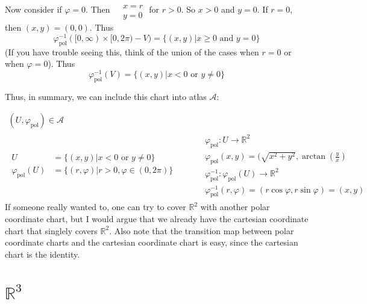 \documentclass[10pt, twoside]{amsart}
\begin{document}
\begin{multicols*}{2}
Now consider if $\varphi=0$.  Then $\begin{aligned} & \quad \\
  & x = r \\ 
  & y = 0 \end{aligned}$ for $r>0$.  So $x>0$ and $y=0$.  If $r=0$, then $(x,y)=(0,0)$.  Thus
\[
\varphi_{\text{pol}}^{-1}( [0,\infty) \times [0,2\pi)-V) = \lbrace (x,y) | x\geq 0 \text{ and } y=0 \rbrace
\]
(If you have trouble seeing this, think of the union of the cases when $r=0$ or when $\varphi=0$).  Thus
\[
\varphi^{-1}_{\text{pol}}(V) = \lbrace (x,y) | x<0 \text{ or } y \neq 0 \rbrace
\]

Thus, in summary, we can include this chart into atlas $\mathcal{A}$:

\begin{equation} \label{Eq:UR2}
\begin{gathered}
  (U, \varphi_{\text{pol}}) \in \mathcal{A} \\ 
  \begin{aligned}
    U & = \lbrace (x,y) | x<0 \text{ or } y \neq 0 \rbrace  \\
    \varphi_{\text{pol}}(U) & = \lbrace (r,\varphi) | r >0, \varphi \in (0,2\pi) \rbrace
\end{aligned} \quad \quad \, \begin{aligned}
    & \varphi_{\text{pol}}:U \to \mathbb{R}^2 \\ 
    & \varphi_{\text{pol}}(x,y) = ( \sqrt{x^2 + y^2}, \arctan{ \left( \frac{y}{x} \right) } \\ 
    & \varphi^{-1}_{\text{pol}}: \varphi_{\text{pol}}(U) \to \mathbb{R}^2 \\ 
    & \varphi^{-1}_{\text{pol}}(r,\varphi) = (r\cos{\varphi}, r\sin{\varphi}) = (x,y)
\end{aligned}
\end{gathered}
\end{equation}
If someone really wanted to, one can try to cover $\mathbb{R}^2$ with another polar coordinate chart, but I would argue that we already have the cartesian coordinate chart that singlely covers $\mathbb{R}^2$. Also note that the transition map between polar coordinate charts and the cartesian coordinate chart is easy, since the cartesian chart is the identity.  

\section{$\mathbb{R}^3$}


\end{multicols*}
\end{document}
